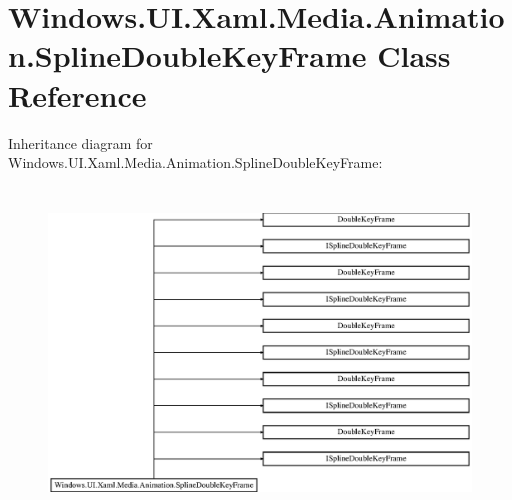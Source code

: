 \hypertarget{class_windows_1_1_u_i_1_1_xaml_1_1_media_1_1_animation_1_1_spline_double_key_frame}{}\section{Windows.\+U\+I.\+Xaml.\+Media.\+Animation.\+Spline\+Double\+Key\+Frame Class Reference}
\label{class_windows_1_1_u_i_1_1_xaml_1_1_media_1_1_animation_1_1_spline_double_key_frame}
Inheritance diagram for Windows.\+U\+I.\+Xaml.\+Media.\+Animation.\+Spline\+Double\+Key\+Frame\+:\begin{figure}[H]
\begin{center}
\leavevmode
\includegraphics[height=8.750000cm]{class_windows_1_1_u_i_1_1_xaml_1_1_media_1_1_animation_1_1_spline_double_key_frame}
\end{center}
\end{figure}
